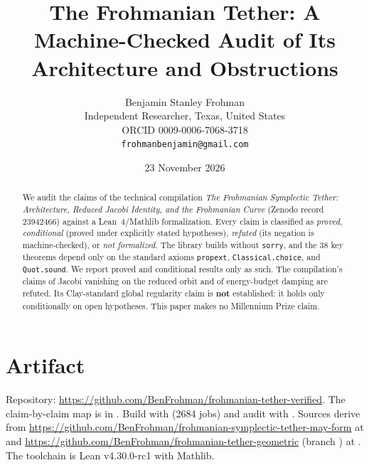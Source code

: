 \documentclass[11pt]{article}
\title{The Frohmanian Tether: A Machine-Checked Audit of Its Architecture and Obstructions}
\author{Benjamin Stanley Frohman\\ Independent Researcher, Texas, United States\\ ORCID 0009-0006-7068-3718\\ \texttt{frohmanbenjamin@gmail.com}}
\date{23 November 2026}
\begin{document}
\maketitle
\begin{abstract}
We audit the claims of the technical compilation \emph{The Frohmanian Symplectic Tether: Architecture, Reduced Jacobi Identity, and the Frohmanian Curve} (Zenodo record 23942466) against a Lean~4/Mathlib formalization. Every claim is classified as \emph{proved}, \emph{conditional} (proved under explicitly stated hypotheses), \emph{refuted} (its negation is machine-checked), or \emph{not formalized}. The library builds without \texttt{sorry}, and the 38 key theorems depend only on the standard axioms \texttt{propext}, \texttt{Classical.choice}, and \texttt{Quot.sound}. We report proved and conditional results only as such. The compilation's claims of Jacobi vanishing on the reduced orbit and of energy-budget damping are refuted. Its Clay-standard global regularity claim is \textbf{not} established: it holds only conditionally on open hypotheses. This paper makes no Millennium Prize claim.
\end{abstract}

\section{Artifact}
Repository: \url{https://github.com/BenFrohman/frohmanian-tether-verified}. The claim-by-claim map is in . Build with  (2684 jobs) and audit with . Sources derive from \url{https://github.com/BenFrohman/frohmanian-symplectic-tether-may-form} at  and \url{https://github.com/BenFrohman/frohmanian-tether-geometric} (branch ) at . The toolchain is Lean v4.30.0-rc1 with Mathlib.
\end{document}
